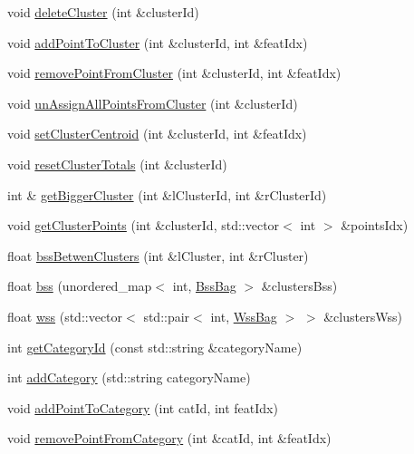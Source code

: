 \begin{DoxyCompactItemize}
\item 
void \hyperlink{class_memory_a97043ab11f12fdd595e18ffc1fcd2291}{delete\+Cluster} (int \&cluster\+Id)
\item 
void \hyperlink{class_memory_a56ad78b70a31d0688dc160b029b8cf0e}{add\+Point\+To\+Cluster} (int \&cluster\+Id, int \&feat\+Idx)
\item 
void \hyperlink{class_memory_a3f1f42a162bbee90517642e9b2aad294}{remove\+Point\+From\+Cluster} (int \&cluster\+Id, int \&feat\+Idx)
\item 
void \hyperlink{class_memory_a638e22630bebfff55e6122b38d37c464}{un\+Assign\+All\+Points\+From\+Cluster} (int \&cluster\+Id)
\item 
void \hyperlink{class_memory_afae3d1c028779858634b0cfe0492a214}{set\+Cluster\+Centroid} (int \&cluster\+Id, int \&feat\+Idx)
\item 
void \hyperlink{class_memory_a4e5a7afc93319dd8be8f17dcfd6dc3c2}{reset\+Cluster\+Totals} (int \&cluster\+Id)
\item 
int \& \hyperlink{class_memory_aa80e09318da917906522a6cdf27b052b}{get\+Bigger\+Cluster} (int \&l\+Cluster\+Id, int \&r\+Cluster\+Id)
\item 
void \hyperlink{class_memory_a3666067f038b6765440a66cd5a3989f0}{get\+Cluster\+Points} (int \&cluster\+Id, std\+::vector$<$ int $>$ \&points\+Idx)
\item 
float \hyperlink{class_memory_aa4dae2fc7a803982c1926e2808389f73}{bss\+Betwen\+Clusters} (int \&l\+Cluster, int \&r\+Cluster)
\item 
float \hyperlink{class_memory_a74fc1ce26e175d8c992e201a3017064b}{bss} (unordered\+\_\+map$<$ int, \hyperlink{class_bss_bag}{Bss\+Bag} $>$ \&clusters\+Bss)
\item 
float \hyperlink{class_memory_a951c156d970ba7fa7a61290b1d63d95b}{wss} (std\+::vector$<$ std\+::pair$<$ int, \hyperlink{class_wss_bag}{Wss\+Bag} $>$ $>$ \&clusters\+Wss)
\item 
int \hyperlink{class_memory_a239bd8dc977f6dff458b3973e1dd4bb2}{get\+Category\+Id} (const std\+::string \&category\+Name)
\item 
int \hyperlink{class_memory_a082886bbe8c386bb7ce25a25f1b7ea8a}{add\+Category} (std\+::string category\+Name)
\item 
void \hyperlink{class_memory_a18516769c393cb146b32b42a4973176b}{add\+Point\+To\+Category} (int cat\+Id, int feat\+Idx)
\item 
void \hyperlink{class_memory_ad4a2f8d5ad6def3bca8ca8cfff122d66}{remove\+Point\+From\+Category} (int \&cat\+Id, int \&feat\+Idx)

\end{DoxyCompactItemize}
